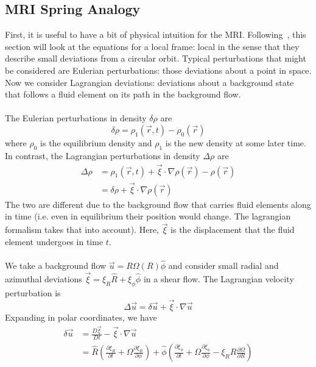 \subsection{MRI Spring Analogy}
First, it is useful to have a bit of physical intuition for the MRI. Following~\cite{Kunz2016HW2,Kunz2016HW3}, this section will look at the equations for a local frame: local in the sense that they describe small deviations from a circular orbit. Typical perturbations that might be considered are Eulerian perturbations: those deviations about a point in space. Now we consider Lagrangian deviations: deviations about a background state that follows a fluid element on its path in the background flow. \\
\\
The Eulerian perturbations in density $\delta\rho$ are
\begin{equation*}
\delta\rho=\rho_1(\vec r,t)-\rho_0(\vec r)
\end{equation*}
where $\rho_0$ is the equilibrium density and $\rho_1$ is the new density at some later time. In contrast, the Lagrangian perturbations in density $\Delta\rho$ are
\begin{align*}
\Delta\rho&=\rho_1(\vec r,t)+\vec\xi\cdot\nabla\rho(\vec r)-\rho(\vec r)\\
&=\delta\rho+\vec\xi\cdot\nabla\rho(\vec r)
\end{align*}
The two are different due to the background flow that carries fluid elements along in time (i.e. even in equilibrium their position would change. The lagrangian formalism takes that into account). Here, $\vec\xi$ is the displacement that the fluid element undergoes in time $t$. \\
\\
We take a background flow $\vec u=R\Omega(R)\hat\phi$ and consider small radial and azimuthal deviations $\vec\xi=\xi_R\hat R+\xi_\phi\hat\phi$ in a shear flow. The Lagrangian velocity perturbation is
\begin{equation*}
\Delta\vec u=\delta\vec u+\vec\xi\cdot\nabla\vec u
\end{equation*}
Expanding in polar coordinates, we have
\begin{align}
\delta\vec u&=\frac{D\vec\xi}{Dt}-\vec\xi\cdot\nabla\vec u\nonumber\\
&=\hat R\left(\frac{\partial\xi_R}{\partial t}+\Omega\frac{\partial\xi_R}{\partial\phi}\right)+\hat\phi\left(\frac{\partial\xi_\phi}{\partial t}+\Omega\frac{\partial\xi_\phi}{\partial\phi}-\xi_RR\frac{\partial\Omega}{\partial R}\right) \label{eq:du1}
\end{align}
